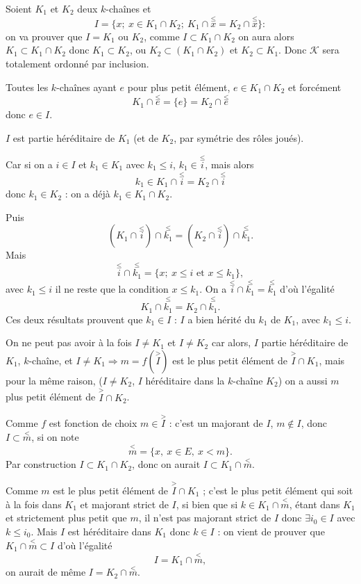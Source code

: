 Soient $K_1$ et $K_2$ deux $k$-chaînes et
\[
I=\{x;\ x\in K_1\cap K_2;\ K_1\cap\overset{\le}{x}=K_2\cap\overset{\le}{x}\} :
\]
on va prouver que $I=K_1$ ou $K_2$, comme $I\subset K_1\cap K_2$ on aura alors $K_1\subset K_1\cap K_2$ donc $K_1\subset K_2$, ou $K_2\subset(K_1\cap K_2)$ et $K_2\subset K_1$. Donc $\mathcal K$ sera totalement ordonné par inclusion.

Toutes les $k$-chaînes ayant $e$ pour plus petit élément, $e\in K_1\cap K_2$ et forcément
\[
K_1\cap\overset{\le}{e}=\{e\}=K_2\cap\overset{\le}{e}
\]
donc $e\in I$.

$I$ est partie héréditaire de $K_1$ (et de $K_2$, par symétrie des rôles joués).

Car si on a $i\in I$ et $k_1\in K_1$ avec $k_1\le i$, $k_1\in\overset{\le}{i}$, mais alors
\[
k_1\in K_1\cap\overset{\le}{i}=K_2\cap\overset{\le}{i}
\]
donc $k_1\in K_2$ : on a déjà $k_1\in K_1\cap K_2$.

Puis
\[
(K_1\cap\overset{\le}{i})\cap\overset{\le}{k_1}
=(K_2\cap\overset{\le}{i})\cap\overset{\le}{k_1}.
\]
Mais
\[
\overset{\le}{i}\cap\overset{\le}{k_1}
=\{x;\ x\le i\text{ et }x\le k_1\},
\]
avec $k_1\le i$ il ne reste que la condition $x\le k_1$. On a $\overset{\le}{i}\cap\overset{\le}{k_1}=\overset{\le}{k_1}$ d'où l'égalité
\[
K_1\cap\overset{\le}{k_1}=K_2\cap\overset{\le}{k_1}.
\]
Ces deux résultats prouvent que $k_1\in I$ : $I$ a bien hérité du $k_1$ de $K_1$, avec $k_1\le i$.

On ne peut pas avoir à la fois $I\ne K_1$ et $I\ne K_2$ car alors, $I$ partie héréditaire de $K_1$, $k$-chaîne, et $I\ne K_1\Rightarrow m=f(\overset{>}{I})$ est le plus petit élément de $\overset{>}{I}\cap K_1$, mais pour la même raison, ($I\ne K_2$, $I$ héréditaire dans la $k$-chaîne $K_2$) on a aussi $m$ plus petit élément de $\overset{>}{I}\cap K_2$.

Comme $f$ est fonction de choix $m\in\overset{>}{I}$ : c'est un majorant de $I$, $m\notin I$, donc $I\subset\overset{<}{m}$, si on note
\[
\overset{<}{m}=\{x,\ x\in E,\ x<m\}.
\]
Par construction $I\subset K_1\cap K_2$, donc on aurait $I\subset K_1\cap\overset{<}{m}$.

Comme $m$ est le plus petit élément de $\overset{>}{I}\cap K_1$ ; c'est le plus petit élément qui soit à la fois dans $K_1$ et majorant strict de $I$, si bien que si $k\in K_1\cap\overset{<}{m}$, étant dans $K_1$ et strictement plus petit que $m$, il n'est pas majorant strict de $I$ donc $\exists i_0\in I$ avec $k\le i_0$. Mais $I$ est héréditaire dans $K_1$ donc $k\in I$ : on vient de prouver que $K_1\cap\overset{<}{m}\subset I$ d'où l'égalité
\[
I=K_1\cap\overset{<}{m},
\]
on aurait de même $I=K_2\cap\overset{<}{m}$.

